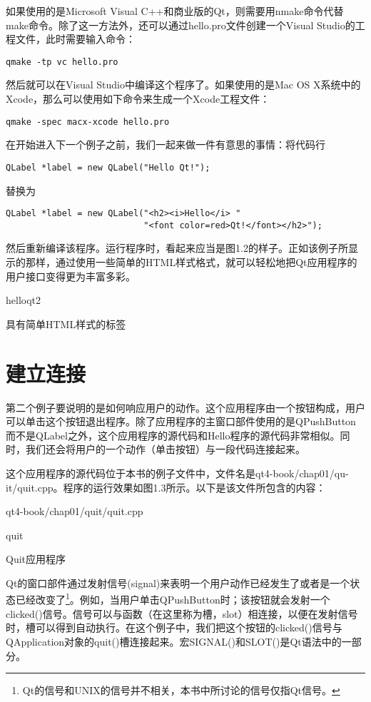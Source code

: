 \documentclass[11pt,oneside]{book}
\begin{document}
\begin{common-format}
如果使用的是Microsoft Visual C++和商业版的Qt，则需要用nmake命令代替make命令。除了这一方法外，还可以通过hello.pro文件创建一个Visual Studio的工程文件，此时需要输入命令：

\begin{Verbatim}
qmake -tp vc hello.pro
\end{Verbatim}

然后就可以在Visual Studio中编译这个程序了。如果使用的是Mac OS X系统中的Xcode，那么可以使用如下命令来生成一个Xcode工程文件：
\begin{Verbatim}
qmake -spec macx-xcode hello.pro
\end{Verbatim}

在开始进入下一个例子之前，我们一起来做一件有意思的事情：将代码行
\begin{Verbatim}
QLabel *label = new QLabel("Hello Qt!");
\end{Verbatim}

替换为
\begin{Verbatim}
QLabel *label = new QLabel("<h2><i>Hello</i> "
                           "<font color=red>Qt!</font></h2>");
\end{Verbatim}

然后重新编译该程序。运行程序时，看起来应当是图1.2的样子。正如该例子所显示的那样，通过使用一些简单的HTML样式格式，就可以轻松地把Qt应用程序的用户接口变得更为丰富多彩。
\begin{fig}{helloqt2}
\caption{具有简单HTML样式的标签}
\label{fig:helloqt2}
\end{fig}

\section{建立连接}
第二个例子要说明的是如何响应用户的动作。这个应用程序由一个按钮构成，用户可以单击这个按钮退出程序。除了应用程序的主窗口部件使用的是QPushButton而不是QLabel之外，这个应用程序的源代码和Hello程序的源代码非常相似。同时，我们还会将用户的一个动作（单击按钮）与一段代码连接起来。

这个应用程序的源代码位于本书的例子文件中，文件名是qt4-book/chap01/qu-it/quit.cpp。程序的运行效果如图1.3所示。以下是该文件所包含的内容：
\begin{cppinput}{qt4-book/chap01/quit/quit.cpp}
\end{cppinput}

\begin{fig}{quit}
\caption{Quit应用程序}
\label{fig:quit}
\end{fig}

Qt的窗口部件通过发射信号(signal)来表明一个用户动作已经发生了或者是一个状态已经改变了\footnote{Qt的信号和UNIX的信号并不相关，本书中所讨论的信号仅指Qt信号。}。例如，当用户单击QPushButton时；该按钮就会发射一个clicked()信号。信号可以与函数（在这里称为槽，slot）相连接，以便在发射信号时，槽可以得到自动执行。在这个例子中，我们把这个按钮的clicked()信号与QApplication对象的quit()槽连接起来。宏SIGNAL()和SLOT()是Qt语法中的一部分。


\end{common-format}
\end{document}
